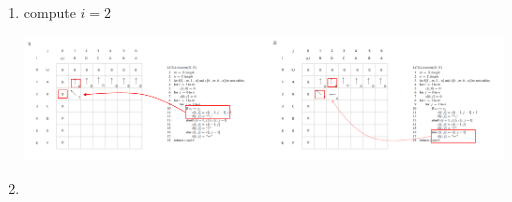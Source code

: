 \documentclass[12pt]{article}
\begin{document}
\begin{enumerate}[1.]
\begin{itemize}
\begin{itemize}
\begin{enumerate}[1.]
\begin{enumerate}[1)]
                    \item compute $i = 2$

                    \begin{center}
                    \includegraphics[width=\linewidth]{images/worksheet_3_solution_17.png}
                    \end{center}

                    \item



                \end{enumerate}
            \end{enumerate}
        \end{itemize}
    \end{itemize}
\end{enumerate}
\end{document}
